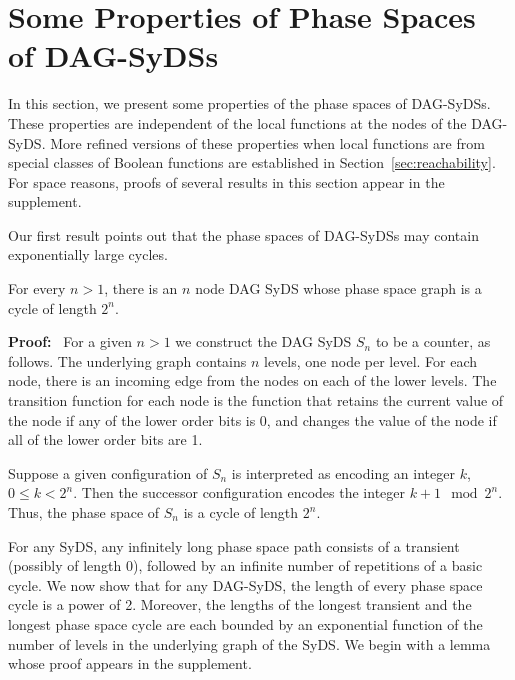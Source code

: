 \section{Some Properties of Phase Spaces of DAG-SyDSs}
\label{sec:bounded-levels}

In this section, we present some properties of the
phase spaces of DAG-SyDSs.
These properties are independent of the local functions
at the nodes of the DAG-SyDS.
More refined versions of these properties when local
functions are from special classes of Boolean functions
are established in Section~\ref{sec:reachability}. 
For space reasons, proofs of several results 
in this section appear in the supplement.

Our first result points out that the phase spaces
of DAG-SyDSs may contain exponentially large cycles.

\smallskip
\begin{proposition}\label{pro:long_phase_space_cycle}
For every $n  > 1$, there is an $n$ node DAG SyDS 
whose phase space graph is a cycle of length $2^n$.
\end{proposition}

\noindent
\textbf{Proof:}~ 
For a given $n > 1$ we construct the DAG SyDS $S_n$ to be a counter, as follows.
The underlying graph contains $n$ levels, one node per level. 
For each node, there is an incoming edge from the nodes on each of the lower levels.
The transition function for each node is the function 
that retains the current value of the node if any of the lower order bits is 0,
and changes the value of the node if all of the lower order bits are 1.

Suppose a given configuration of $S_n$ is interpreted as encoding
an integer $k$, $0 \leq k < 2^n$.  Then the successor configuration
encodes the integer $k + 1 \mod 2^n$.  Thus, the phase space of
$S_n$ is a cycle of length $2^n$.  \QED

For any SyDS, any infinitely long phase space path consists of a
transient (possibly of length 0), followed by an infinite number
of repetitions of a basic cycle.  We now show that for any 
DAG-SyDS, the length of every phase space cycle is a power of 2.
Moreover, the lengths of the longest transient and the longest phase
space cycle are each bounded by an exponential function of the
number of levels in the underlying graph of the SyDS.
We begin with a lemma whose proof appears in the supplement.

